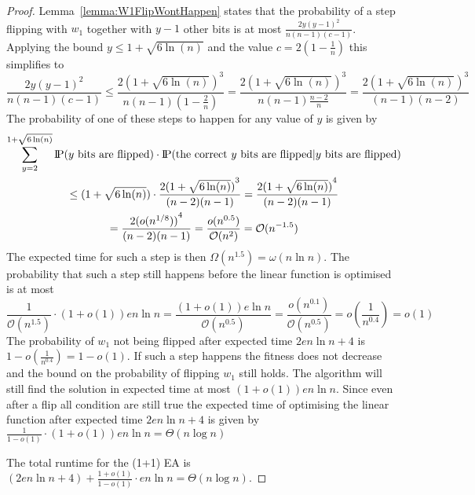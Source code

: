\begin{proof}
    Lemma~\ref{lemma:W1FlipWontHappen} states that the probability of a step flipping with $w_1$ together with $y-1$ other bits is at most $\frac{2y{(y-1)}^2}{n(n-1)(c-1)}$.
    Applying the bound $y\le1+\sqrt{6\ln(n)}$ and the value $c=2(1-\frac{1}{n})$ this simplifies to
    \[
        \frac{2y{(y-1)}^2}{n(n-1)(c-1)}
        \le\frac{2{(1+\sqrt{6\ln(n)})}^3}{n(n-1)(1-\frac{2}{n})}
        =\frac{2{(1+\sqrt{6\ln(n)})}^3}{n(n-1)\frac{n-2}{n}}
        =\frac{2{(1+\sqrt{6\ln(n)})}^3}{(n-1)(n-2)}
    \]
    The probability of one of these steps to happen for any value of $y$ is given by
    \begin{gather}
        \nonumber \sum_{y=2}^{1+\sqrt{6\ln(n)}}{\text{I\kern-0.15em P}(y \text{ bits are flipped})\cdot\text{I\kern-0.15em P}(\text{the correct $y$ bits are flipped} | y \text{ bits are flipped})}\\
        \nonumber \le ({1+\sqrt{6\ln(n)}})\cdot\frac{2{(1+\sqrt{6\ln(n)})}^{3}}{(n-2)(n-1)}
        = \frac{2{(1+\sqrt{6\ln(n)})}^{4}}{(n-2)(n-1)}\\ \nonumber
        = \frac{2{(o({n}^{1/8}))}^{4}}{(n-2)(n-1)}
        = \frac{o(n^{0.5})}{\mathcal{O}(n^{2})}
        = \mathcal{O}(n^{-1.5})
    \end{gather}
    The expected time for such a step is then $\Omega(n^{1.5})=\omega(n\ln n)$.
    The probability that such a step still happens before the linear function is optimised is at most
    \[
        \frac{1}{\mathcal{O}(n^{1.5})}\cdot(1+o(1))en\ln n
        =\frac{(1+o(1))e\ln n}{\mathcal{O}(n^{0.5})}
        =\frac{o(n^{0.1})}{\mathcal{O}(n^{0.5})}
        =o(\frac{1}{n^{0.4}})=o(1)\]
    The probability of $w_1$ not being flipped after expected time $2en\ln n+4$ is \(1-o(\frac{1}{n^{0.4}})=1-o(1)\).
    If such a step happens the fitness does not decrease and the bound on the probability of flipping $w_1$ still holds.
    The algorithm will still find the solution in expected time at most $(1+o(1))en\ln n$.
    Since even after a flip all condition are still true the expected time of optimising the linear function after expected time $2en\ln n+4$ is given by \(\frac{1}{1-o(1)}\cdot(1+o(1))en\ln n=\Theta(n\log{}n)\)

    The total runtime for the (1+1) EA is $(2en\ln n+4) + \frac{1+o(1)}{1-o(1)}\cdot en\ln n =\Theta(n\log{}n)$.



\end{proof}
